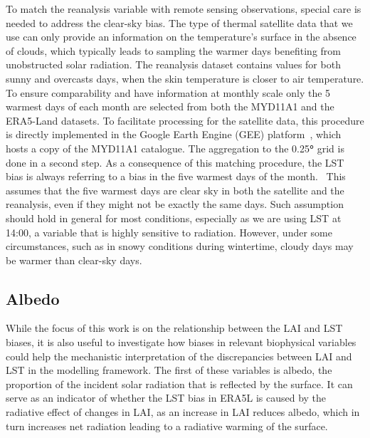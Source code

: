 \documentclass[gmd, manuscript]{copernicus}
\begin{document}
To match the reanalysis variable with remote sensing observations,
special care is needed to address the clear-sky bias. The type of
thermal satellite data that we use can only provide an information on
the temperature's surface in the absence of clouds, which typically
leads to sampling the warmer days benefiting from unobstructed solar
radiation. The reanalysis dataset contains values for both sunny and
overcasts days, when the skin temperature is closer to air temperature.
To ensure comparability and have information at monthly scale only the
5 warmest days of each month are selected from both the MYD11A1 and the
ERA5-Land datasets. To facilitate processing for the satellite data,
this procedure is directly implemented in the Google Earth Engine (GEE)
platform~\citep{Gorelick_2017}, which hosts a copy of the MYD11A1
catalogue. The aggregation to the 0.25\textbf{°} grid is done in a
second step. As a consequence of this matching procedure, the LST bias
is always referring to a bias in the five warmest days of the month.~
This assumes that the five warmest days are clear sky in both the satellite 
and the reanalysis, even if they might not be exactly the same days. Such 
assumption should hold in general for most conditions, especially as we are 
using LST at 14:00, a variable that is highly sensitive to radiation. 
However, under some circumstances, such as in snowy conditions during 
wintertime, cloudy days may be warmer than clear-sky days.


\subsection{Albedo}

While the focus of this work is on the relationship between the LAI and
LST biases, it is also useful to investigate how biases in relevant
biophysical variables could help the mechanistic interpretation of the
discrepancies between LAI and LST in the modelling framework. The first
of these variables is albedo, the proportion of the incident solar
radiation that is reflected by the surface. It can serve as an indicator
of whether the LST bias in ERA5L is caused by the radiative effect of
changes in LAI, as an increase in LAI reduces albedo, which in turn
increases net radiation leading to a radiative warming of the surface.
\end{document}
